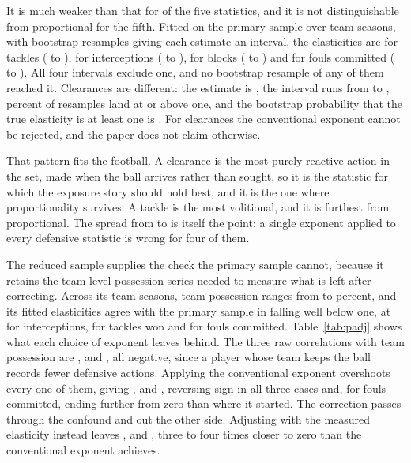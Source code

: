 It is much weaker than that for \NElastExcludeOne{} of the five statistics, and it is not
distinguishable from
proportional for the fifth. Fitted on the primary sample over \ArcPadjTeamSeasons{}
team-seasons, with \ElastNBootstrap{} bootstrap resamples giving each estimate an interval, the
elasticities are \ArcElastTackles{} for tackles (\ElastCITacklesLow{} to \ElastCITacklesHigh{}),
\ArcElastInterceptions{} for interceptions (\ElastCIInterceptionsLow{} to
\ElastCIInterceptionsHigh{}), \ArcElastBlocks{} for blocks (\ElastCIBlocksLow{} to
\ElastCIBlocksHigh{}) and \ArcElastFouls{} for fouls committed (\ElastCIFoulsLow{} to
\ElastCIFoulsHigh{}). All four intervals exclude one, and no bootstrap resample of any of them
reached it. Clearances are different: the estimate is \ArcElastClearances{}, the interval runs
from \ElastCIClearancesLow{} to \ElastCIClearancesHigh{}, \ElastShareOneClearances{} percent of
resamples land at or above one, and the bootstrap probability that the true elasticity is at
least one is \ElastPOneClearances{}. For clearances the conventional exponent cannot be
rejected, and the paper does not claim otherwise.

That pattern fits the football. A clearance is the most purely reactive action in the set, made
when the ball arrives rather than sought, so it is the statistic for which the exposure story
should hold best, and it is the one where proportionality survives. A tackle is the most
volitional, and it is furthest from proportional. The spread from \ArcElastMin{} to
\ArcElastMax{} is itself the point: a single exponent applied to every defensive statistic is
wrong for four of them.

The reduced sample supplies the check the primary sample cannot, because it retains the
team-level possession series needed to measure what is left after correcting. Across its
\PadjTeamSeasons{} team-seasons, team possession ranges from \PadjPossessionMin{} to
\PadjPossessionMax{} percent, and its fitted elasticities agree with the primary sample in
falling well below one, at \ElasticityInterceptions{} for interceptions,
\ElasticityTackles{} for tackles won and \ElasticityFouls{} for fouls committed.
Table~\ref{tab:padj} shows what each choice of exponent leaves behind. The three raw
correlations with team possession are \PadjCorrRawInterceptions{}, \PadjCorrRawTackles{} and
\PadjCorrRawFouls{}, all negative, since a player whose team keeps the ball records fewer
defensive actions. Applying the conventional exponent overshoots every one of them, giving
\PadjCorrUnitInterceptions{}, \PadjCorrUnitTackles{} and \PadjCorrUnitFouls{}, reversing sign
in all three cases and, for fouls committed, ending further from zero than where it started.
The correction passes through the confound and out the other side. Adjusting with the measured
elasticity instead leaves \PadjCorrAdjInterceptions{}, \PadjCorrAdjTackles{} and
\PadjCorrAdjFouls{}, three to four times closer to zero than the conventional exponent achieves.


